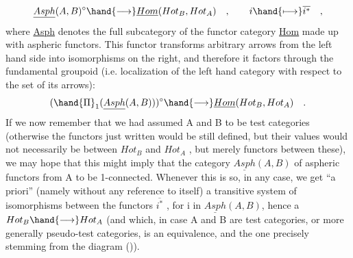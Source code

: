 
\[ \underline{Asph}(A,B)^{\circ}\hand{\longrightarrow}\underline{Hom}(Hot_{B},Hot_{A}) \quad , \qquad i \hand{\longmapsto} \overline{i^{*}} \quad , \]
where \uline{Asph} denotes the full subcategory of the functor category \uline{Hom}
made up with aspheric functors. This functor transforms arbitrary
arrows from the left hand side into isomorphisms on the right, and
therefore it factors through the fundamental groupoid (i.e. localization
of the left hand category with respect to the set of \hand{\uline{\textcolor{black}{all}}} its arrows):
\[ (\hand{\Pi}_{1}(\underline{Asph}(A,B)))^{\circ} \hand{\longrightarrow} \underline{Hom}(Hot_{B},Hot_{A}) \quad . \]
If we now remember that we had assumed A and B to be test categories
(otherwise the functors just written would be still defined, but their
values would not necessarily be \hand{\uline{\textcolor{black}{equivalences}}} between $Hot_{B}$ and $Hot_{A}$ ,
but merely functors between these), we may hope that this might imply
that the category $\underline{Asph}(A,B)$ of aspheric functors from A  to be 
1-connected. Whenever this is so, in any case, we get ``a priori''
(namely without any reference to \hand{(}\hand{\uline{\textcolor{black}{Hot}}}\hand{)} itself) a transitive system of
isomorphisms between the functors $\overline{i^{*}}$ , for i in $\underline{Asph}(A,B)$, 
 hence a  \hand{\uline{\textcolor{black}{functor}}} $Hot_{B}\hand{\longrightarrow}Hot_{A}$\hand{,} \hand{\uline{\textcolor{black}{defined up to}}}\hand{\unsure{,}} \hand{\uline{\textcolor{black}{unique isomorphism}}}
(and which, in case A and B are test categories, or more generally
pseudo-test categories\xout{*}, is an equivalence, and the one precisely
 stemming from the diagram ()).

